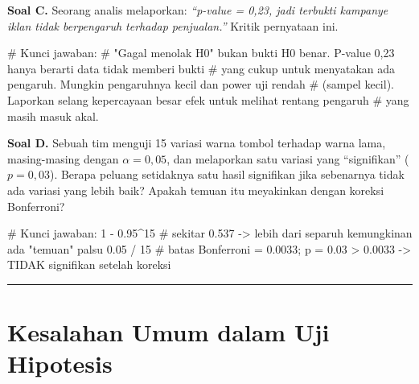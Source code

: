 \documentclass[
  indonesian,
  letterpaper,
]{book}
\newenvironment{Shaded}{\begin{snugshade}}{\end{snugshade}}
\newcommand{\CommentTok}[1]{\textcolor[rgb]{0.37,0.37,0.37}{#1}}
\newcommand{\DecValTok}[1]{\textcolor[rgb]{0.68,0.00,0.00}{#1}}
\newcommand{\FloatTok}[1]{\textcolor[rgb]{0.68,0.00,0.00}{#1}}
\newcommand{\SpecialCharTok}[1]{\textcolor[rgb]{0.37,0.37,0.37}{#1}}
\begin{document}
\textbf{Soal C.} Seorang analis melaporkan: \emph{``p-value = 0,23, jadi
terbukti kampanye iklan tidak berpengaruh terhadap penjualan.''} Kritik
pernyataan ini.

\begin{Shaded}
\begin{Highlighting}[]
\CommentTok{\# Kunci jawaban:}
\CommentTok{\# "Gagal menolak H0" bukan bukti H0 benar. P{-}value 0,23 hanya berarti data tidak memberi bukti}
\CommentTok{\# yang cukup untuk menyatakan ada pengaruh. Mungkin pengaruhnya kecil dan power uji rendah}
\CommentTok{\# (sampel kecil). Laporkan selang kepercayaan besar efek untuk melihat rentang pengaruh}
\CommentTok{\# yang masih masuk akal.}
\end{Highlighting}
\end{Shaded}

\textbf{Soal D.} Sebuah tim menguji 15 variasi warna tombol terhadap
warna lama, masing-masing dengan \(\alpha = 0{,}05\), dan melaporkan
satu variasi yang ``signifikan'' (\(p = 0{,}03\)). Berapa peluang
setidaknya satu hasil signifikan jika sebenarnya tidak ada variasi yang
lebih baik? Apakah temuan itu meyakinkan dengan koreksi Bonferroni?

\begin{Shaded}
\begin{Highlighting}[]
\CommentTok{\# Kunci jawaban:}
\DecValTok{1} \SpecialCharTok{{-}} \FloatTok{0.95}\SpecialCharTok{\^{}}\DecValTok{15}   \CommentTok{\# sekitar 0.537 {-}\textgreater{} lebih dari separuh kemungkinan ada "temuan" palsu}
\FloatTok{0.05} \SpecialCharTok{/} \DecValTok{15}     \CommentTok{\# batas Bonferroni = 0.0033; p = 0.03 \textgreater{} 0.0033 {-}\textgreater{} TIDAK signifikan setelah koreksi}
\end{Highlighting}
\end{Shaded}

\begin{center}\rule{0.5\linewidth}{0.5pt}\end{center}

\section{Kesalahan Umum dalam Uji
Hipotesis}\label{kesalahan-umum-dalam-uji-hipotesis}
\end{document}
